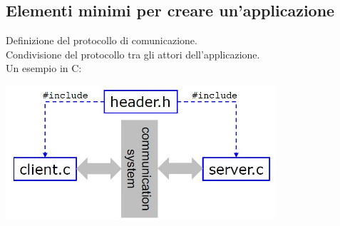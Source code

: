 \subsection{Elementi minimi per creare un'applicazione}
Definizione del protocollo di comunicazione.
\\Condivisione del protocollo tra gli attori dell'applicazione.
\\Un esempio in C:
\begin{center}
    \includegraphics[width=0.75\textwidth]{img/esC_app1.jpg}
\end{center}
